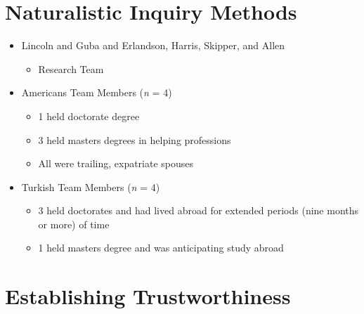 \documentclass[
  english,
]{book}
\providecommand{\tightlist}{%
  \setlength{\itemsep}{0pt}\setlength{\parskip}{0pt}}
\begin{document}
\hypertarget{naturalistic-inquiry-methods}{%
\section{Naturalistic Inquiry Methods}\label{naturalistic-inquiry-methods}}

\begin{itemize}
\tightlist
\item
  Lincoln and Guba \citeyearpar{lincoln_naturalistic_1985} and Erlandson, Harris, Skipper, and Allen \citeyearpar{erlandson_doing_1993}

  \begin{itemize}
  \tightlist
  \item
    Research Team
  \end{itemize}
\item
  Americans Team Members (\emph{n} = 4)

  \begin{itemize}
  \tightlist
  \item
    1 held doctorate degree
  \item
    3 held masters degrees in helping professions
  \item
    All were trailing, expatriate spouses
  \end{itemize}
\item
  Turkish Team Members (\emph{n} = 4)

  \begin{itemize}
  \tightlist
  \item
    3 held doctorates and had lived abroad for extended periods (nine months or more) of time
  \item
    1 held masters degree and was anticipating study abroad
  \end{itemize}
\end{itemize}

\hypertarget{establishing-trustworthiness}{%
\section{Establishing Trustworthiness}\label{establishing-trustworthiness}}
\end{document}

